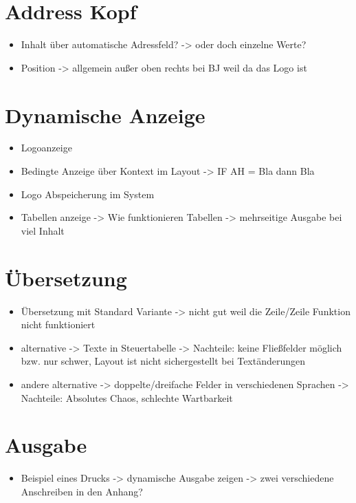 \section{Address Kopf}

	\begin{itemize}
		\item Inhalt über automatische Adressfeld? -> oder doch einzelne Werte?
		\item Position -> allgemein außer oben rechts bei BJ weil da das Logo ist
	\end{itemize}
\FloatBarrier
\section{Dynamische Anzeige}

	\begin{itemize}
		\item Logoanzeige
		\item Bedingte Anzeige über Kontext im Layout -> IF AH = Bla dann Bla
		\item Logo Abspeicherung im System
		
		\item Tabellen anzeige -> Wie funktionieren Tabellen -> mehrseitige Ausgabe bei viel Inhalt
		
	\end{itemize}
\FloatBarrier
\section{Übersetzung}

	\begin{itemize}
		\item Übersetzung mit Standard Variante -> nicht gut weil die Zeile/Zeile Funktion nicht funktioniert
		\item alternative -> Texte in Steuertabelle -> Nachteile: keine Fließfelder möglich bzw. nur schwer, Layout ist nicht sichergestellt bei Textänderungen
		\item andere alternative -> doppelte/dreifache Felder in verschiedenen Sprachen -> Nachteile: Absolutes Chaos, schlechte Wartbarkeit
	\end{itemize}
\FloatBarrier
\section{Ausgabe}

	\begin{itemize}
		\item Beispiel eines Drucks -> dynamische Ausgabe zeigen -> zwei verschiedene Anschreiben in den Anhang?
	\end{itemize}
